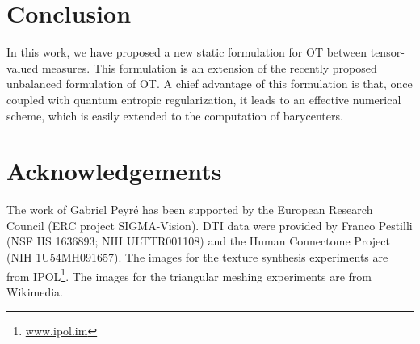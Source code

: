 
\section{Conclusion}

In this work, we have proposed a new static formulation for OT between tensor-valued measures. This formulation is an extension of the recently proposed unbalanced formulation of OT. A chief advantage of this formulation is that, once coupled with quantum entropic regularization, it leads to an effective numerical scheme, which is easily extended to the computation of barycenters. 


\section*{Acknowledgements}

The work of Gabriel Peyr\'e has been supported by the European Research Council (ERC project SIGMA-Vision).
%
DTI data were provided by Franco Pestilli (NSF IIS 1636893; NIH ULTTR001108) and the Human Connectome Project (NIH 1U54MH091657). 
%
The images for the texture synthesis experiments are from IPOL\footnote{\url{www.ipol.im}}.
% 
The images for the triangular meshing experiments are from Wikimedia.
